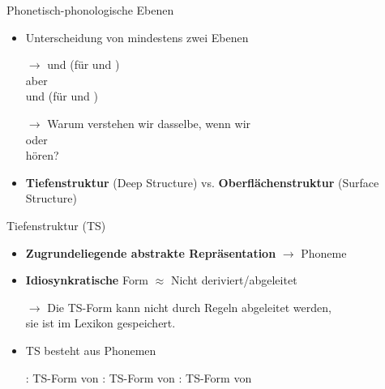 \begin{frame}{Phonetisch-phonologische Ebenen}

	\begin{itemize}
		\item Unterscheidung von mindestens zwei Ebenen
		\item[$\rightarrow$]  und  (für  und )\\
		aber\\
		 und  (für  und )
		\item[]
		\item[$\rightarrow$] Warum verstehen wir dasselbe, wenn wir\\
		\textipa{[h a: k @ \alertred{n}]} oder \textipa{[h a: k \alertred{N}]}\\
		hören?
		\item[]
		\item \textbf{Tiefenstruktur} (Deep Structure) vs. \textbf{Oberflächenstruktur} (Surface Structure)
	\end{itemize}
	
\end{frame}




\begin{frame}{Tiefenstruktur (TS)}
	
\begin{itemize}
	\item \textbf{Zugrundeliegende abstrakte Repräsentation} $\rightarrow$ Phoneme \textipa{/ /}
	\item[]
	\item \textbf{Idiosynkratische} Form $\approx$ Nicht deriviert/abgeleitet
	\item[$\rightarrow$] Die TS-Form kann nicht durch Regeln abgeleitet werden,\\
                sie ist im Lexikon gespeichert.
	\item[]
	\item TS besteht aus Phonemen
	
	\eal
		\ex {}: TS-Form von 
		\ex {}: TS-Form von 
		\ex {}: TS-Form von 
	\zl
	
\end{itemize}
		
\end{frame}


